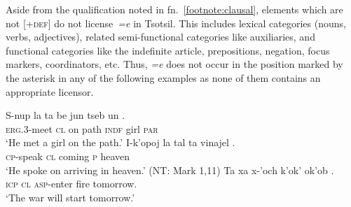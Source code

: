 \documentclass[output=paper,
modfonts
]{LSP/langsci}
\begin{document}
Aside from the qualification noted in fn.~\ref{footnote:clausal}, elements which are not [\textsc{+def}] do not license\ \emph{=e} in Tsotsil. 
This includes lexical categories (nouns, verbs, adjectives),
related semi-functional categories like auxiliaries, and functional categories like the indefinite article,
prepositions, negation, focus markers, coordinators, etc.  
Thus,  \emph{=e} does not occur in the position marked by the asterisk in any of the following examples
 as none of them contains an appropriate licensor.
\begin{exe}
\ex
\begin{xlist}
\gll S-nup la ta be jun tseb un \textasteriskcentered.    \\
\textsc{erg.3}-meet \textsc{cl} on path \textsc{indf} girl \textsc{par} \\
\glt `He met a girl on the path.' \citep[306]{laughlin1977}  
\gll  I-k'opoj la tal ta vinajel \textasteriskcentered.  \\
\textsc{cp}-speak \textsc{cl} coming \textsc{p} heaven\\
\glt `He spoke on arriving in heaven.' (NT: Mark 1,11)
 \gll Ta xa x-'och k'ok' ok'ob \textasteriskcentered. \\
\textsc{icp} \textsc{cl} \textsc{asp}-enter fire tomorrow. \\
\glt `The war will start tomorrow.' \citep[119]{laughlin1977} 
\end{xlist}
\label{exe:licensors}
\end{exe}
\end{document}
